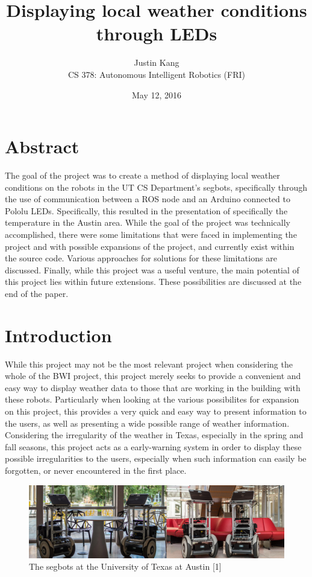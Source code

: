 \documentclass[12pt]{article}
\title{\vspace{-3em} \textbf{\Large Displaying local weather conditions through LEDs}}
\author{Justin Kang \\ CS 378: Autonomous Intelligent Robotics (FRI)}
\date{May 12, 2016}
\begin{document}
\maketitle


\section*{Abstract} 
The goal of the project was to create a method of displaying local weather conditions on the robots in the UT CS Department's segbots, specifically through the use of communication between a ROS node and an Arduino connected to Pololu LEDs. Specifically, this resulted in the presentation of specifically the temperature in the Austin area. While the goal of the project was technically accomplished, there were some limitations that were faced in implementing the project and with possible expansions of the project, and currently exist within the source code. Various approaches for solutions for these limitations are discussed. Finally, while this project was a useful venture, the main potential of this project lies within future extensions. These possibilities are discussed at the end of the paper.


\section{Introduction}
While this project may not be the most relevant project when considering the whole of the BWI project, this project merely seeks to provide a convenient and easy way to display weather data to those that are working in the building with these robots. Particularly when looking at the various possibilites for expansion on this project, this provides a very quick and easy way to present information to the users, as well as presenting a wide possible range of weather information. Considering the irregularity of the weather in Texas, especially in the spring and fall seasons, this project acts as a early-warning system in order to display these possible irregularities to the users, especially when such information can easily be forgotten, or never encountered in the first place.


\begin{figure}[ht]
\centering
\includegraphics[height=0.3\textwidth, width=\textwidth]{Segbot.jpg}
\caption{The segbots at the University of Texas at Austin [1]}
\end{figure}
\end{document}
